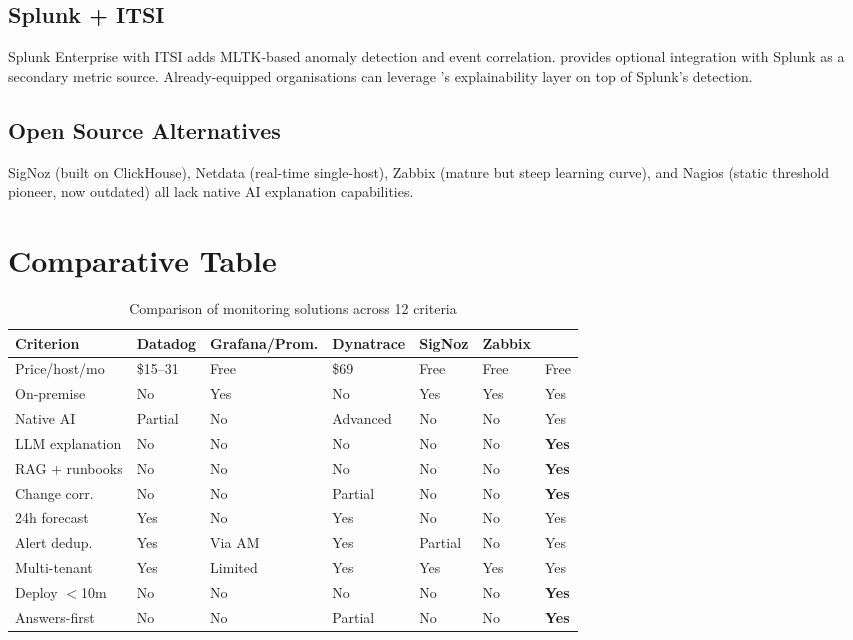 \subsection{Splunk + ITSI}

Splunk Enterprise with ITSI \cite{splunk_itsi} adds MLTK-based anomaly detection
and event correlation. \caimp{} provides optional integration with Splunk as a
secondary metric source. Already-equipped organisations can leverage \caimp{}'s
explainability layer on top of Splunk's detection.

\subsection{Open Source Alternatives}

SigNoz (built on ClickHouse), Netdata (real-time single-host), Zabbix (mature
but steep learning curve), and Nagios (static threshold pioneer, now outdated)
all lack native AI explanation capabilities.

\section{Comparative Table}

\begin{table}[H]
\centering
\caption{Comparison of monitoring solutions across 12 criteria}
\label{tab:comparison}
\small
\begin{tabularx}{\textwidth}{lXXXXXX}
\toprule
\textbf{Criterion} & \textbf{Datadog} & \textbf{Grafana/Prom.} & \textbf{Dynatrace}
  & \textbf{SigNoz} & \textbf{Zabbix} & \textbf{\caimp{}} \\
\midrule
Price/host/mo  & \$15--31    & Free       & \$69     & Free        & Free       & Free \\
On-premise     & No          & Yes        & No       & Yes         & Yes        & Yes \\
Native AI      & Partial     & No         & Advanced & No          & No         & Yes \\
LLM explanation& No          & No         & No       & No          & No         & \textbf{Yes} \\
RAG + runbooks & No          & No         & No       & No          & No         & \textbf{Yes} \\
Change corr.   & No          & No         & Partial  & No          & No         & \textbf{Yes} \\
24h forecast   & Yes         & No         & Yes      & No          & No         & Yes \\
Alert dedup.   & Yes         & Via AM     & Yes      & Partial     & No         & Yes \\
Multi-tenant   & Yes         & Limited    & Yes      & Yes         & Yes        & Yes \\
Deploy $<$10m  & No          & No         & No       & No          & No         & \textbf{Yes} \\
Answers-first  & No          & No         & Partial  & No          & No         & \textbf{Yes} \\
\bottomrule
\end{tabularx}
\end{table}

